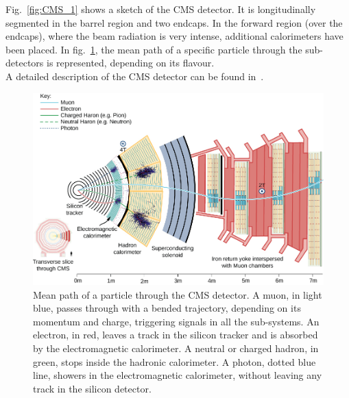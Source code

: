 \noindent Fig.~\ref{fig:CMS_1} shows a sketch of the CMS detector. It is longitudinally segmented in the barrel region and two endcaps. In the forward region (over the endcaps), where the beam radiation is very intense, additional calorimeters have been placed. In fig.~\ref{fig:CMS_particles}, the mean path of a specific particle through the sub-detectors is represented, depending on its flavour.\\
A detailed description of the CMS detector can be found in~\cite{Chatrchyan:2008zzk}.

\begin{figure}[!htb]
  \centering
    \includegraphics[width=.99\textwidth]{figures/CMS_particles.jpg}
  \caption{Mean path of a particle through the CMS detector. A muon, in light blue, passes through with a bended trajectory, depending on its momentum and charge, triggering signals in all the sub-systems. An electron, in red, leaves a track in the silicon tracker and is absorbed by the electromagnetic calorimeter. A neutral or charged hadron, in green, stops inside the hadronic calorimeter. A photon, dotted blue line, showers in the electromagnetic calorimeter, without leaving any track in the silicon detector.}
  \label{fig:CMS_particles}
\end{figure}

